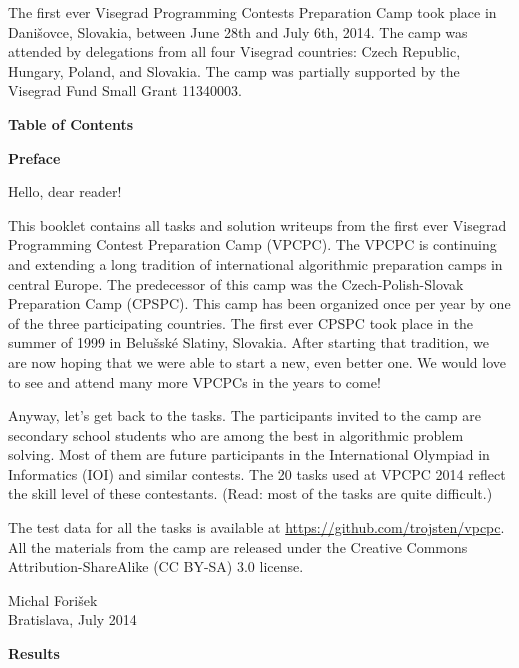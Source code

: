 \documentclass[oneside,a4paper]{book}
\begin{document}
The first ever Visegrad Programming Contests Preparation Camp took place in Danišovce, Slovakia,
between June 28th and July 6th, 2014. The camp was attended by delegations from all four Visegrad
countries: Czech Republic, Hungary, Poland, and Slovakia. The camp was partially supported
by the Visegrad Fund Small Grant 11340003.
\newpage

\noindent\centerline{\sf\Large\bfseries Table of Contents}
\makeatletter\let\l@section\l@chapter\let\l@chapter\l@part{}\makeatother
\newpage

\noindent\centerline{\sf\large\bfseries Preface}
\bigskip

Hello, dear reader!
\bigskip

This booklet contains all tasks and solution writeups from the
first ever Visegrad Programming Contest Preparation Camp (VPCPC).
The VPCPC is continuing and extending a long tradition of 
international algorithmic preparation camps in central Europe.
The predecessor of this camp was the Czech-Polish-Slovak
Preparation Camp (CPSPC). This camp has been organized once per year
by one of the three participating countries. The first ever CPSPC
took place in the summer of 1999 in Belušské Slatiny, Slovakia.
After starting that tradition, we are now hoping that we were able
to start a new, even better one. We would love to see and attend
many more VPCPCs in the years to come!
\bigskip

Anyway, let's get back to the tasks. The participants invited to
the camp are secondary school students who are among the best in
algorithmic problem solving. Most of them are future participants
in the International Olympiad in Informatics (IOI) and similar
contests. The 20 tasks used at VPCPC 2014 reflect the skill level
of these contestants. (Read: most of the tasks are quite difficult.)
\bigskip

The test data for all the tasks is available at
\url{https://github.com/trojsten/vpcpc}.
All the materials from the camp are released under the
Creative Commons Attribution-ShareAlike (CC BY-SA) 3.0 
license.
\bigskip

\null\hfill Michal Forišek \\
\null\hfill Bratislava, July 2014

\newpage

\noindent\centerline{\sf\large\bfseries Results}
\bigskip
{}
\newpage
\end{document}
